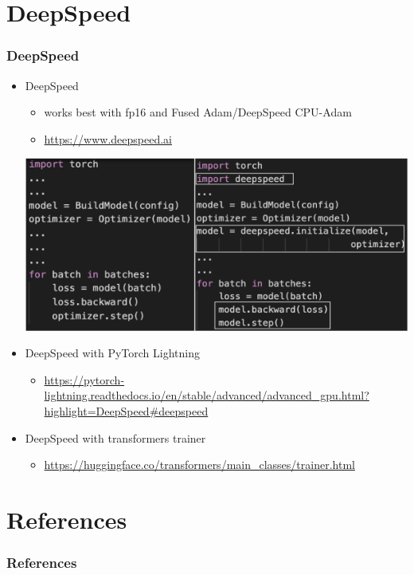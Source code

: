 \documentclass{beamer}
\begin{document}
\section{DeepSpeed}
\begin{frame}
    \frametitle{DeepSpeed}
    \begin{itemize}
        \item DeepSpeed
        \begin{itemize}
 			\item \footnotesize{works best with fp16 and Fused Adam/DeepSpeed CPU-Adam}
        	\item \footnotesize{\url{https://www.deepspeed.ai}}
        \end{itemize}
        \begin{center}
    		\includegraphics[scale=1.0]{img/deepspeed_zero.png}
	    \end{center}

        \item DeepSpeed with PyTorch Lightning
        \begin{itemize}
        	\item \footnotesize{\url{https://pytorch-lightning.readthedocs.io/en/stable/advanced/advanced_gpu.html?highlight=DeepSpeed\#deepspeed}}
        \end{itemize}

        \item DeepSpeed with transformers trainer
        \begin{itemize}
        	\item \footnotesize{\url{https://huggingface.co/transformers/main_classes/trainer.html}}
        \end{itemize}
    \end{itemize}
\end{frame}


\section{References}
\begin{frame}[allowframebreaks,t]
    \tiny
    \frametitle{References}
    
    
\end{frame}
\end{document}

